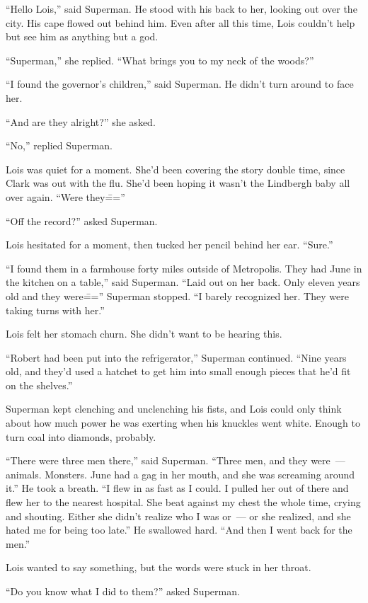 \documentclass[ebook,12pt]{memoir}
\begin{document}
``Hello Lois,'' said Superman. He stood with his back to her, looking
out over the city. His cape flowed out behind him. Even after all this
time, Lois couldn't help but see him as anything but a god.

``Superman,'' she replied. ``What brings you to my neck of the woods?''

``I found the governor's children,'' said Superman. He didn't turn
around to face her.

``And are they alright?'' she asked.

``No,'' replied Superman.

Lois was quiet for a moment. She'd been covering the story double time,
since Clark was out with the flu. She'd been hoping it wasn't the
Lindbergh baby all over again. ``Were they\===''

``Off the record?'' asked Superman.

Lois hesitated for a moment, then tucked her pencil behind her ear.
``Sure.''

``I found them in a farmhouse forty miles outside of Metropolis. They
had June in the kitchen on a table,'' said Superman. ``Laid out on her
back. Only eleven years old and they were\==='' Superman stopped. ``I
barely recognized her. They were taking turns with her.''

Lois felt her stomach churn. She didn't want to be hearing this.

``Robert had been put into the refrigerator,'' Superman continued.
``Nine years old, and they'd used a hatchet to get him into small enough
pieces that he'd fit on the shelves.''

Superman kept clenching and unclenching his fists, and Lois could only
think about how much power he was exerting when his knuckles went white.
Enough to turn coal into diamonds, probably.

``There were three men there,'' said Superman. ``Three men, and they
were~--- animals. Monsters. June had a gag in her mouth, and she was
screaming around it.'' He took a breath. ``I flew in as fast as I could.
I pulled her out of there and flew her to the nearest hospital. She beat
against my chest the whole time, crying and shouting. Either she didn't
realize who I was or~--- or she realized, and she hated me for being too
late.'' He swallowed hard. ``And then I went back for the men.''

Lois wanted to say something, but the words were stuck in her throat.

``Do you know what I did to them?'' asked Superman.
\end{document}
